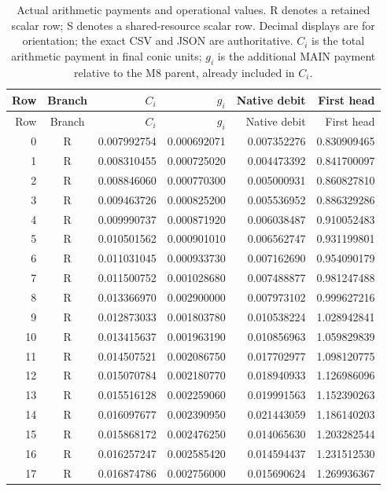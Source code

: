 \documentclass[11pt,a4paper]{article}
\theoremstyle{definition}
\theoremstyle{remark}
\begin{document}
\clearpage
\begingroup\small
\setlength{\tabcolsep}{4pt}
\begin{longtable}{rcrrrr}
\caption{Actual arithmetic payments and operational values. R denotes a retained scalar row; S denotes a shared-resource scalar row. Decimal displays are for orientation; the exact CSV and JSON are authoritative. $C_i$ is the total arithmetic payment in final conic units; $g_i$ is the additional MAIN payment relative to the M8 parent, already included in $C_i$.}\label{tab:credit-audit}\\
\toprule Row & Branch & $C_i$ & $g_i$ & Native debit & First head\\\midrule\endfirsthead
\toprule Row & Branch & $C_i$ & $g_i$ & Native debit & First head\\\midrule\endhead
0 & R & 0.007992754 & 0.000692071 & 0.007352276 & 0.830909465 \\
1 & R & 0.008310455 & 0.000725020 & 0.004473392 & 0.841700097 \\
2 & R & 0.008846060 & 0.000770300 & 0.005000931 & 0.860827810 \\
3 & R & 0.009463726 & 0.000825200 & 0.005536952 & 0.886329286 \\
4 & R & 0.009990737 & 0.000871920 & 0.006038487 & 0.910052483 \\
5 & R & 0.010501562 & 0.000901010 & 0.006562747 & 0.931199801 \\
6 & R & 0.011031045 & 0.000933730 & 0.007162690 & 0.954090179 \\
7 & R & 0.011500752 & 0.001028680 & 0.007488877 & 0.981247488 \\
8 & R & 0.013366970 & 0.002900000 & 0.007973102 & 0.999627216 \\
9 & R & 0.012873033 & 0.001803780 & 0.010538224 & 1.028942841 \\
10 & R & 0.013415637 & 0.001963190 & 0.010856963 & 1.059829839 \\
11 & R & 0.014507521 & 0.002086750 & 0.017702977 & 1.098120775 \\
12 & R & 0.015070784 & 0.002180770 & 0.018940933 & 1.126986096 \\
13 & R & 0.015516128 & 0.002259060 & 0.019991563 & 1.152390263 \\
14 & R & 0.016097677 & 0.002390950 & 0.021443059 & 1.186140203 \\
15 & R & 0.015868172 & 0.002476250 & 0.014065630 & 1.203282544 \\
16 & R & 0.016257247 & 0.002585420 & 0.014594437 & 1.231512530 \\
17 & R & 0.016874786 & 0.002756000 & 0.015690624 & 1.269936367 \\

\end{longtable}
\end{document}
